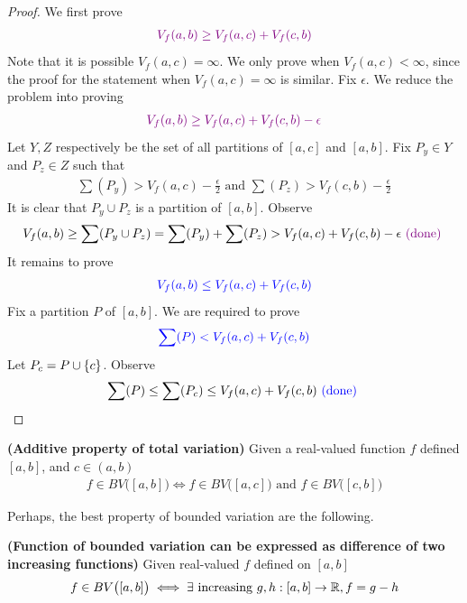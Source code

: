 \documentclass{report}
\begin{document}
\begin{proof}
We first prove 
\begin{align*}
\textcolor{violet}{V_f(a,b)\geq V_f(a,c)+V_f(c,b)}
\end{align*}
Note that it is possible $V_f(a,c)=\infty$. We only prove when $V_f(a,c)<\infty$, since the proof for the statement when $V_f(a,c)=\infty$ is similar. Fix $\epsilon $. We reduce the problem into proving 
\begin{align*}
  \textcolor{violet}{V_f(a,b)\geq V_f(a,c)+ V_f(c,b)- \epsilon }
\end{align*}
Let $Y,Z$ respectively be the set of all partitions of  $[a,c]$ and $[a,b]$. Fix $P_y \in Y$ and $P_z\in Z$ such that 
\begin{align*}
\sum (P_y) > V_f(a,c)- \frac{\epsilon }{2} \text{ and } \sum (P_z)> V_f(c,b)- \frac{\epsilon}{2}
\end{align*}
It is clear that $P_y\cup P_z$  is a partition of $[a,b]$. Observe
\begin{align*}
  V_f(a,b)\geq \sum (P_y \cup P_z) = \sum (P_y) + \sum (P_z) > V_f(a,c) + V_f(c,b)- \epsilon \textcolor{violet}{\text{ (done) }}
\end{align*}
It remains to prove
\begin{align*}
  \textcolor{blue}{V_f(a,b)\leq V_f(a,c)+ V_f(c,b)}
\end{align*}
Fix a partition $P$ of $[a,b]$. We are required to prove 
\begin{align*}
\textcolor{blue}{\sum (P) < V_f(a,c)+ V_f(c,b)}
\end{align*}
Let $P_c = P \cup \{ c \}$. Observe 
\begin{align*}
\sum (P) \leq \sum (P_c) \leq V_f(a,c) + V_f(c,b) \textcolor{blue}{\text{ (done) }}
\end{align*}

\end{proof}
\begin{corollary}
\textbf{(Additive property of total variation)} Given a real-valued function $f$  defined $[a,b]$, and $c \in (a,b)$ 
\begin{align*}
f\in BV\big([a,b] \big)\iff f\in BV\big([a,c] \big)\text{ and }f\in BV\big([c,b] \big)
\end{align*}
\end{corollary}
\begin{mdframed}
Perhaps, the best property of bounded variation are the following.  
\end{mdframed}
\begin{theorem}
\label{Fob}
\textbf{(Function of bounded variation can be expressed as difference of two increasing functions)} Given real-valued $f$ defined on  $[a,b]$ 
\begin{align*}
f\in BV\big([a,b] \big)\iff \exists \text{ increasing }g,h:[a,b]\rightarrow \mathbb{R}, f=g-h
\end{align*}
\end{theorem}
\end{document}
